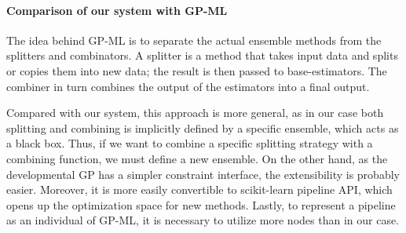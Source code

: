 \paragraph{Comparison of our system with GP-ML}
The idea behind GP-ML is to separate the actual ensemble methods from the splitters
and combinators. A splitter is a method that takes input data and splits or copies them
into new data; the result is then passed to base-estimators. The combiner in turn
combines the output of the estimators into a final output.

Compared with our system, this approach is more general, as in our case both
splitting and combining is implicitly defined by a specific ensemble, which acts as
a black box. Thus, if we want to combine a specific splitting strategy with a
combining function, we must define a new ensemble. On the other hand, as the
developmental GP has a simpler constraint interface, the extensibility is probably
easier. Moreover, it is more easily convertible to scikit-learn pipeline API, which
opens up the optimization space for new methods. Lastly, to represent a pipeline as
an individual of GP-ML, it is necessary to utilize more nodes than in our case.